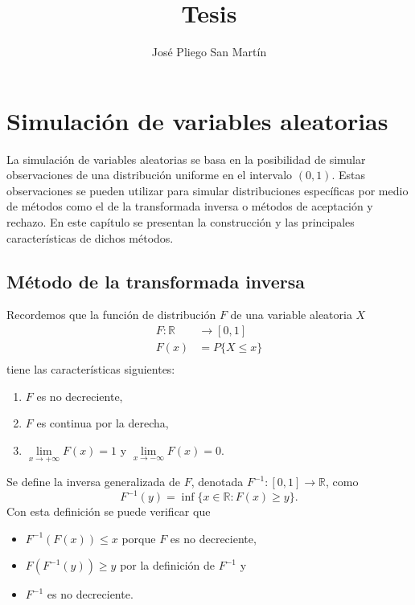 \documentclass[10pt,a4paper]{article}
\author{José Pliego San Martín}
\title{Tesis}
\begin{document}
\maketitle

\setlength{\parindent}{0pt}

\section{Simulación de variables aleatorias}

La simulación de variables aleatorias se basa en la posibilidad de simular observaciones de una distribución uniforme en el intervalo $(0, 1)$. Estas observaciones se pueden utilizar para simular distribuciones específicas por medio de métodos como el de la transformada inversa o métodos de aceptación y rechazo. En este capítulo se presentan la construcción y las principales características de dichos métodos.

\subsection{Método de la transformada inversa}

Recordemos que la función de distribución $F$ de una variable aleatoria $X$
\begin{align*}
F: \mathbb{R}&\to [0,1]\\
F(x) &= P\{X \leq x\}\\
\end{align*}
tiene las características siguientes:

\begin{enumerate}
\item $F$ es no decreciente,\\
\item $F$ es continua por la derecha,\\
\item $\lim\limits_{x\to +\infty}F(x) = 1$ y $\lim\limits_{x\to -\infty}F(x) = 0$.\\
\end{enumerate}

Se define la inversa generalizada de $F$, denotada $F^{-1}:[0,1]\to \mathbb{R}$, como $$F^{-1}(y) = \inf \{x\in \mathbb{R}: F(x) \geq y\}.$$ Con esta definición se puede verificar que

\begin{itemize}
\item $F^{-1}(F(x)) \leq x$ porque $F$ es no decreciente,\\
\item $F(F^{-1}(y)) \geq y$ por la definición de $F^{-1}$ y\\
\item $F^{-1}$ es no decreciente.\\
\end{itemize}
\end{document}

